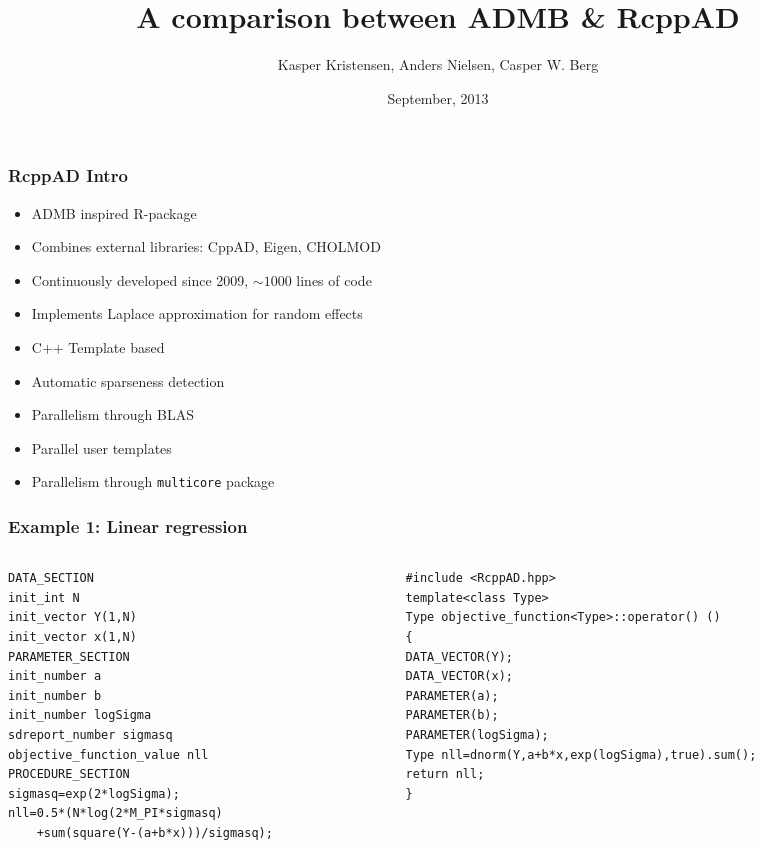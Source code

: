 \documentclass[compress]{beamer}
\title[RcppAD]
{A comparison between ADMB \& RcppAD}
\author[K. Kristensen, A. Nielsen, C.W. Berg ]%
{Kasper Kristensen, Anders Nielsen, Casper W. Berg}
\date[September 2013] %
{September, 2013}
\begin{document}
\begin{frame}[plain]
  \titlepage
\end{frame}

\begin{frame}
\frametitle{RcppAD Intro}

\begin{itemize}
  \item ADMB inspired R-package
  \item Combines external libraries: CppAD, Eigen, CHOLMOD
  \item Continuously developed since 2009, $\sim 1000$ lines of code
  \item Implements Laplace approximation for random effects
  \item C++ Template based
  \item Automatic sparseness detection
  \item Parallelism through BLAS
  \item Parallel user templates
  \item Parallelism through \texttt{multicore} package 
\end{itemize}


\end{frame}

\begin{frame}[fragile]
  \frametitle{Example 1: Linear regression}
\begin{columns}
    \begin{column}{0.5\textwidth}
\tiny{
\begin{verbatim}
DATA_SECTION
init_int N
init_vector Y(1,N)
init_vector x(1,N)
PARAMETER_SECTION
init_number a
init_number b
init_number logSigma
sdreport_number sigmasq
objective_function_value nll
PROCEDURE_SECTION
sigmasq=exp(2*logSigma);
nll=0.5*(N*log(2*M_PI*sigmasq)
    +sum(square(Y-(a+b*x)))/sigmasq);
\end{verbatim}
}
    \end{column}
\hspace{-50pt}
\vrule{}
    \begin{column}{0.5\textwidth} 
   \tiny{
    \begin{verbatim}
#include <RcppAD.hpp>
template<class Type>
Type objective_function<Type>::operator() ()
{
DATA_VECTOR(Y);
DATA_VECTOR(x);
PARAMETER(a);
PARAMETER(b);
PARAMETER(logSigma);
Type nll=dnorm(Y,a+b*x,exp(logSigma),true).sum();
return nll;
}
    \end{verbatim}
}

\end{column}
\end{columns}
\end{frame}
\end{document}
